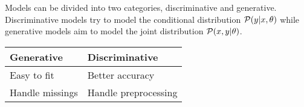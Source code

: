 \documentclass[../main.tex]{subfiles}
\begin{document}
Models can be divided into two categories, discriminative and generative. Discriminative models try to model the conditional distribution $\mathcal{P}(y|x,\theta)$ while generative models aim to model the joint distribution $\mathcal{P}(x,y|\theta)$.
\begin{table}[H]
    \centering
    \begin{tabular}{|p{}|p{}|}
        \hline
        Generative & Discriminative\\
        \hline
        \hline
        Easy to fit & Better accuracy\\
        \hline
        Handle missings & Handle preprocessing\\
        \hline
    \end{tabular}
\end{table}
\end{document}
